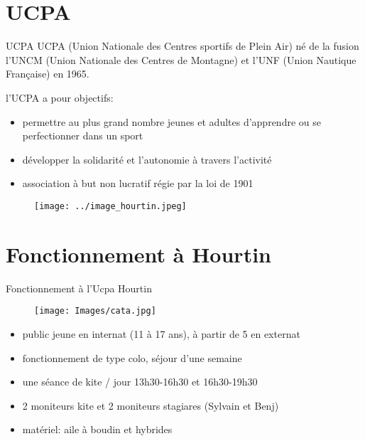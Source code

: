 \documentclass[10pt,a4paper]{beamer}
\begin{document}
\section{UCPA}
\begin{frame}{UCPA}
UCPA (Union Nationale des Centres sportifs de Plein Air) né de la fusion l'UNCM (Union Nationale des Centres de Montagne)
et l'UNF (Union Nautique Française) en 1965.

l'UCPA a pour objectifs:
\begin{itemize}
\item permettre au plus grand nombre jeunes et adultes d'apprendre ou se perfectionner dans un sport
\item développer la solidarité et l'autonomie à travers l'activité
\item association à but non lucratif régie par la loi de 1901
\end{itemize}
\begin{figure}
\texttt{[image: ../image\_hourtin.jpeg]} 
\end{figure}
\end{frame}

\section{Fonctionnement à Hourtin}
\begin{frame}{Fonctionnement à l'Ucpa Hourtin}
\begin{figure}
\texttt{[image: Images/cata.jpg]} 
\end{figure}
\begin{itemize}
\item public jeune en internat (11 à 17 ans), à partir de 5 en externat
\item fonctionnement de type colo, séjour d'une semaine 
\item une séance de kite / jour 13h30-16h30 et 16h30-19h30 
\item 2 moniteurs kite et 2 moniteurs stagiares (Sylvain et Benj)
\item matériel: aile à boudin et hybrides
\end{itemize}
\end{frame}
\end{document}
